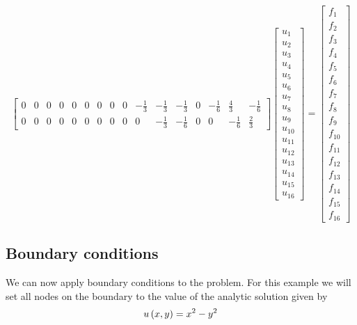 \begin{equation}
\begin{bmatrix}
  0 & 0 & 0 & 0 & 0 & 0 & 0 & 0 & 0 & -\frac{1}{3} & -\frac{1}{3} & -\frac{1}{3} & 0 & -\frac{1}{6} & \frac{4}{3} & -\frac{1}{6} \\
  0 & 0 & 0 & 0 & 0 & 0 & 0 & 0 & 0 & 0 & -\frac{1}{3} & -\frac{1}{6} & 0 & 0 & -\frac{1}{6} & \frac{2}{3}
  \end{bmatrix}\begin{bmatrix}
    u_{1} \\ u_{2} \\ u_{3} \\ u_{4} \\ u_{5} \\ u_{6} \\ u_{7} \\ u_{8} \\ u_{9} \\ u_{10} \\ u_{11} \\ u_{12} \\ u_{13} \\ u_{14} \\ u_{15} \\ u_{16}
  \end{bmatrix}=\begin{bmatrix}
    f_{1} \\ f_{2} \\ f_{3} \\ f_{4} \\ f_{5} \\ f_{6} \\ f_{7} \\ f_{8} \\ f_{9} \\ f_{10} \\ f_{11} \\ f_{12} \\ f_{13} \\ f_{14} \\ f_{15} \\ f_{16}
  \end{bmatrix}
\end{equation}

\subsection{Boundary conditions}
\label{subsec:FEMTwoDLaplaceBoundaryConditions}

We can now apply boundary conditions to the problem. For this example we will set all nodes on the boundary to the value of the analytic solution given by
\begin{equation}
   u\left( x,y \right) =x^{2}-y^{2}
\end{equation}

